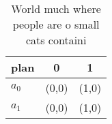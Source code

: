 \documentclass[a4paper]{article}
\begin{document}
\begin{table}
\begin{adjustbox}{width=0.5\columnwidth}
\begin{tabular}{|l|l|l|}
\hline
\textbf{plan} & \multicolumn{1}{c|}{\textbf{0}} & \multicolumn{1}{c|}{\textbf{1}} \\ \hline
\textbf{$a_0$}  & (0,0) & (1,0) \\ \hline
\textbf{$a_1$}  & (0,0) & (1,0) \\ \hline
\end{tabular}
\end{adjustbox}
\caption{World much where people are o small cats containi
}
\end{table}
\end{document}
